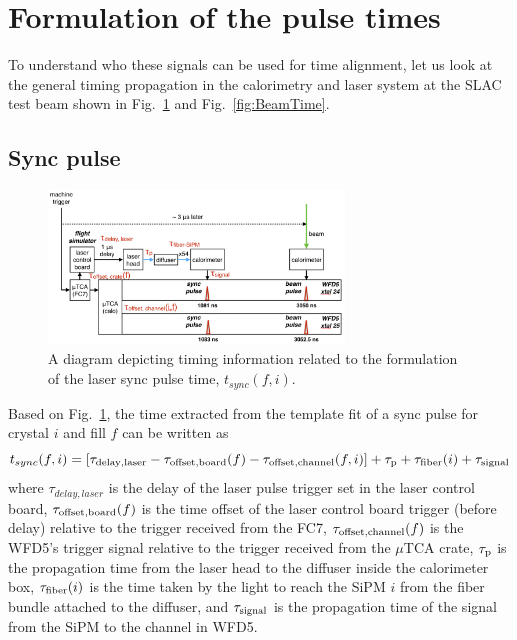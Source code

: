 \section{Formulation of the pulse times}


To understand who these signals can be used for time alignment, let us look at the general timing propagation in the calorimetry and laser system at the SLAC test beam shown in Fig.~\ref{fig:SyncTime} and Fig.~\ref{fig:BeamTime}. 

\subsection{Sync pulse}

\begin{figure}[htbp]
\centering
\includegraphics[width=0.7\textwidth]{pics/SyncTimeFormulation.pdf} 
\caption{A diagram depicting timing information related to the formulation of the laser sync pulse time, $t_{sync}(f,i)$.}\label{fig:SyncTime}
\end{figure}

Based on Fig.~\ref{fig:SyncTime}, the time extracted from the template fit of a sync pulse for crystal $i$ and fill $f$ can be written as
%
\begin{equation}
t_{sync}(f,i) = [ \tau_{\rm{delay,laser}} - \tau_{\rm{offset,board}}(f) - \tau_{\rm{offset,channel}}(f,i) ]  + \tau_{\rm{p}} + \tau_{\rm{fiber}}(i) + \tau_{\rm{signal}} \label{eq:tsync}
\end{equation}
%
where $\tau_{delay,laser}$ is the delay of the laser pulse trigger set in the laser control board, $\tau_{\rm{offset,board}}(f)$ is the time offset of the laser control board trigger (before delay) relative to the trigger received from the FC7, $\tau_{\rm{offset,channel}}(f)$ is the WFD5's trigger signal relative to the trigger received from the $\mu$TCA crate, $\tau_{\rm{p}}$ is the propagation time from the laser head to the diffuser inside the calorimeter box, $\tau_{\rm{fiber}}(i)$ is the time taken by the light to reach the SiPM $i$ from the fiber bundle attached to the diffuser, and $\tau_{\rm{signal}}$ is the propagation time of the signal from the SiPM to the channel in WFD5.

